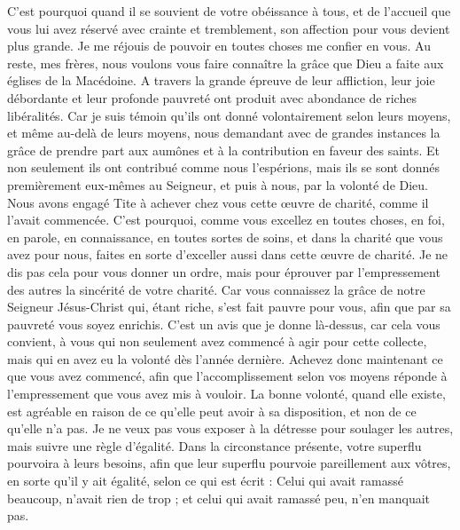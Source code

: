 \begin{multicols}{2}
C'est pourquoi quand il se souvient de votre obéissance à tous, et de l’accueil que vous lui avez réservé avec crainte et tremblement, son affection pour vous devient plus grande.
Je me réjouis de pouvoir en toutes choses me confier en vous.
\VerseOne{}Au reste, mes frères, nous voulons vous faire connaître la grâce que Dieu a faite aux églises de la Macédoine.
A travers la grande épreuve de leur affliction, leur joie débordante et leur profonde pauvreté ont produit avec abondance de riches libéralités.
Car je suis témoin qu'ils ont donné volontairement selon leurs moyens, et même au-delà de leurs moyens,
nous demandant avec de grandes instances la grâce de prendre part aux aumônes et à la contribution en faveur des saints.
Et non seulement ils ont contribué comme nous l’espérions, mais ils se sont donnés premièrement eux-mêmes au Seigneur, et puis à nous, par la volonté de Dieu.
Nous avons engagé Tite à achever chez vous cette œuvre de charité, comme il l’avait commencée.
C'est pourquoi, comme vous excellez en toutes choses, en foi, en parole, en connaissance, en toutes sortes de soins, et dans la charité que vous avez pour nous, faites en sorte d’exceller aussi dans cette œuvre de charité.
Je ne dis pas cela pour vous donner un ordre, mais pour éprouver par l’empressement des autres la sincérité de votre charité.
Car vous connaissez la grâce de notre Seigneur Jésus-Christ qui, étant riche, s'est fait pauvre pour vous, afin que par sa pauvreté vous soyez enrichis.
C’est un avis que je donne là-dessus, car cela vous convient, à vous qui non seulement avez commencé à agir pour cette collecte, mais qui en avez eu la volonté dès l’année dernière.
Achevez donc maintenant ce que vous avez commencé, afin que l’accomplissement selon vos moyens réponde à l’empressement que vous avez mis à vouloir.
La bonne volonté, quand elle existe, est agréable en raison de ce qu’elle peut avoir à sa disposition, et non de ce qu’elle n’a pas.
Je ne veux pas vous exposer à la détresse pour soulager les autres, mais suivre une règle d’égalité. Dans la circonstance présente, votre superflu pourvoira à leurs besoins,
afin que leur superflu pourvoie pareillement aux vôtres, en sorte qu’il y ait égalité,
selon ce qui est écrit : Celui qui avait ramassé beaucoup, n'avait rien de trop ; et celui qui avait ramassé peu, n'en manquait pas.

\end{multicols}
